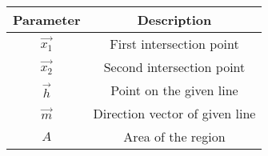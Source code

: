 
\begin{tabular}[12pt]{ |c|c|}
    \hline
    \textbf{Parameter} & \textbf{Description}\\ 
    \hline
    $\vec{x_1}$ & First intersection point\\
    \hline
    $\vec{x_2}$ & Second intersection point\\
    \hline
    $\vec{h}$ & Point on the given line\\
    \hline
    $\vec{m}$ & Direction vector of given line\\
    \hline
    $A$ & Area of the region\\
    \hline
    \end{tabular}

